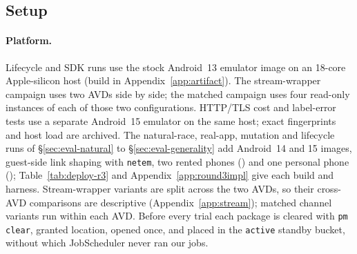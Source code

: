 \subsection{Setup}
\label{sec:setup}

\paragraph{Platform.} Lifecycle and SDK runs use the stock Android~13 emulator image on an 18-core Apple-silicon host
(build in Appendix~\ref{app:artifact}). The stream-wrapper campaign uses two AVDs side by side; the matched campaign uses four read-only instances of each of those two configurations. HTTP/TLS cost and label-error tests use a separate Android~15 emulator on the same host; exact fingerprints and host load are archived. The natural-race, real-app, mutation and lifecycle runs of \S\ref{sec:eval-natural} to \S\ref{sec:eval-generality} add Android~14 and 15 images, guest-side link shaping with \texttt{netem}, two rented phones (\devModel{}) and one personal phone (\racePhoneModel{}); Table~\ref{tab:deploy-r3} and Appendix~\ref{app:round3impl} give each build and harness.
Stream-wrapper variants are split across the two AVDs, so their cross-AVD comparisons are descriptive
(Appendix~\ref{app:stream}); matched channel variants run within each AVD. Before every trial each package is cleared with \texttt{pm clear}, granted location, opened once,
and placed in the \texttt{active} standby bucket, without which JobScheduler never ran our jobs.

